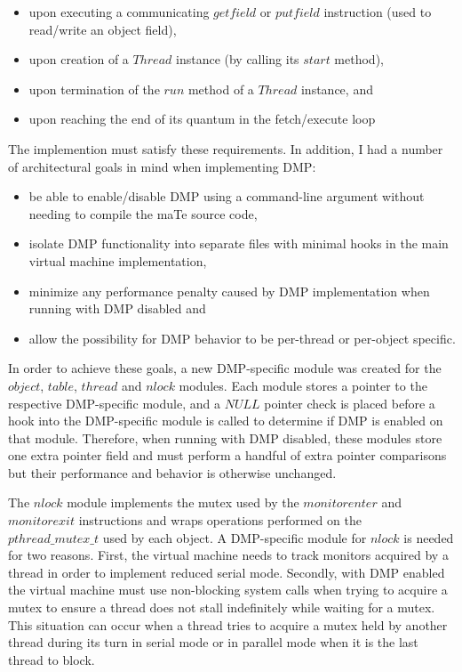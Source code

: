 \begin{itemize}
\item upon executing a communicating $getfield$ or $putfield$
  instruction (used to read/write an object field),
\item upon creation of a $Thread$ instance (by calling its $start$
  method),
\item upon termination of the $run$ method of a $Thread$ instance, and
\item upon reaching the end of its quantum in the fetch/execute loop
\end{itemize}

The implemention must satisfy these requirements.  In addition, I had
a number of architectural goals in mind when implementing DMP:

\begin{itemize}
\item be able to enable/disable DMP using a command-line argument
  without needing to compile the maTe source code,
\item isolate DMP functionality into separate files with minimal hooks
  in the main virtual machine implementation,
\item minimize any performance penalty caused by DMP implementation
  when running with DMP disabled and
\item allow the possibility for DMP behavior to be per-thread or
  per-object specific.
\end{itemize}

In order to achieve these goals, a new DMP-specific module was created
for the $object$, $table$, $thread$ and $nlock$ modules.  Each module
stores a pointer to the respective DMP-specific module, and a $NULL$
pointer check is placed before a hook into the DMP-specific module is
called to determine if DMP is enabled on that module.  Therefore, when
running with DMP disabled, these modules store one extra pointer field
and must perform a handful of extra pointer comparisons but their
performance and behavior is otherwise unchanged.

The $nlock$ module implements the mutex used by the $monitorenter$ and
$monitorexit$ instructions and wraps operations performed on the
$pthread\_mutex\_t$ used by each object.  A DMP-specific module for
$nlock$ is needed for two reasons.  First, the virtual machine needs
to track monitors acquired by a thread in order to implement reduced
serial mode.  Secondly, with DMP enabled the virtual machine must use
non-blocking system calls when trying to acquire a mutex to ensure a
thread does not stall indefinitely while waiting for a mutex.  This
situation can occur when a thread tries to acquire a mutex held by
another thread during its turn in serial mode or in parallel mode when
it is the last thread to block.

